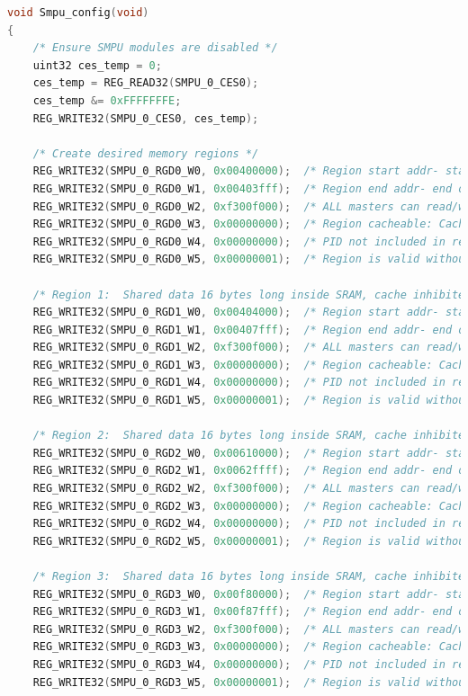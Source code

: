 \begin{lstlisting}[language=C,style=C]
void Smpu_config(void) 
{
    /* Ensure SMPU modules are disabled */
    uint32 ces_temp = 0;
    ces_temp = REG_READ32(SMPU_0_CES0);
    ces_temp &= 0xFFFFFFFE;
    REG_WRITE32(SMPU_0_CES0, ces_temp);

    /* Create desired memory regions */
    REG_WRITE32(SMPU_0_RGD0_W0, 0x00400000);  /* Region start addr- start of SRAM */
    REG_WRITE32(SMPU_0_RGD0_W1, 0x00403fff);  /* Region end addr- end of SRAM  */
    REG_WRITE32(SMPU_0_RGD0_W2, 0xf300f000);  /* ALL masters can read/write */
    REG_WRITE32(SMPU_0_RGD0_W3, 0x00000000);  /* Region cacheable: Cache Inhibit=0*/
    REG_WRITE32(SMPU_0_RGD0_W4, 0x00000000);  /* PID not included in region eval. */
    REG_WRITE32(SMPU_0_RGD0_W5, 0x00000001);  /* Region is valid without lock */

    /* Region 1:  Shared data 16 bytes long inside SRAM, cache inhibited */
    REG_WRITE32(SMPU_0_RGD1_W0, 0x00404000);  /* Region start addr- start of SRAM */
    REG_WRITE32(SMPU_0_RGD1_W1, 0x00407fff);  /* Region end addr- end of SRAM  */
    REG_WRITE32(SMPU_0_RGD1_W2, 0xf300f000);  /* ALL masters can read/write */
    REG_WRITE32(SMPU_0_RGD1_W3, 0x00000000);  /* Region cacheable: Cache Inhibit=0*/
    REG_WRITE32(SMPU_0_RGD1_W4, 0x00000000);  /* PID not included in region eval. */
    REG_WRITE32(SMPU_0_RGD1_W5, 0x00000001);  /* Region is valid without lock */

    /* Region 2:  Shared data 16 bytes long inside SRAM, cache inhibited */
    REG_WRITE32(SMPU_0_RGD2_W0, 0x00610000);  /* Region start addr- start of SRAM */
    REG_WRITE32(SMPU_0_RGD2_W1, 0x0062ffff);  /* Region end addr- end of SRAM  */
    REG_WRITE32(SMPU_0_RGD2_W2, 0xf300f000);  /* ALL masters can read/write */
    REG_WRITE32(SMPU_0_RGD2_W3, 0x00000000);  /* Region cacheable: Cache Inhibit=0*/
    REG_WRITE32(SMPU_0_RGD2_W4, 0x00000000);  /* PID not included in region eval. */
    REG_WRITE32(SMPU_0_RGD2_W5, 0x00000001);  /* Region is valid without lock */

    /* Region 3:  Shared data 16 bytes long inside SRAM, cache inhibited */
    REG_WRITE32(SMPU_0_RGD3_W0, 0x00f80000);  /* Region start addr- start of SRAM */
    REG_WRITE32(SMPU_0_RGD3_W1, 0x00f87fff);  /* Region end addr- end of SRAM  */
    REG_WRITE32(SMPU_0_RGD3_W2, 0xf300f000);  /* ALL masters can read/write */
    REG_WRITE32(SMPU_0_RGD3_W3, 0x00000000);  /* Region cacheable: Cache Inhibit=0*/
    REG_WRITE32(SMPU_0_RGD3_W4, 0x00000000);  /* PID not included in region eval. */
    REG_WRITE32(SMPU_0_RGD3_W5, 0x00000001);  /* Region is valid without lock */


\end{lstlisting}
